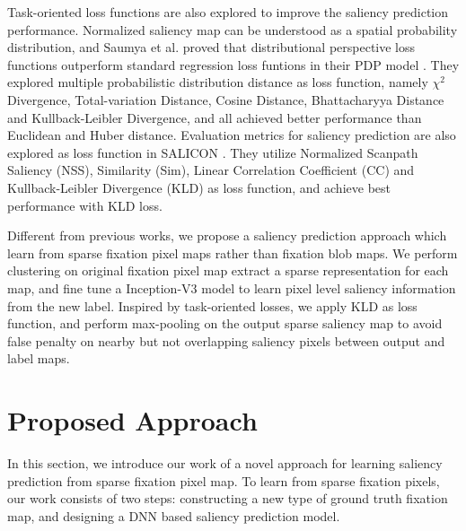 \documentclass[letterpaper, 10 pt, conference]{ieeeconf}  %
\begin{document}
\par Task-oriented loss functions are also explored to improve the saliency prediction performance. Normalized saliency map can be understood as a spatial probability distribution, and Saumya et al. proved that distributional perspective loss functions outperform standard regression loss funtions in their PDP model \cite{b21}. They explored multiple probabilistic distribution distance as loss function, namely $\chi^{2}$ Divergence, Total-variation Distance, Cosine Distance, Bhattacharyya Distance and Kullback-Leibler Divergence, and all achieved better performance than Euclidean and Huber distance. Evaluation metrics for saliency prediction are also explored as loss function in SALICON \cite{b7}. They utilize Normalized Scanpath Saliency (NSS), Similarity (Sim), Linear Correlation Coefficient (CC) and Kullback-Leibler Divergence (KLD) as loss function, and achieve best performance with KLD loss.

\par Different from previous works, we propose a saliency prediction approach which learn from sparse fixation pixel maps rather than fixation blob maps. We perform clustering on original fixation pixel map extract a sparse representation for each map, and fine tune a Inception-V3 model \cite{b22} to learn pixel level saliency information from the new label. Inspired by task-oriented losses, we apply KLD as loss function, and perform max-pooling on the output sparse saliency map to avoid false penalty on nearby but not overlapping saliency pixels between output and label maps.

\section{Proposed Approach}

\par In this section, we introduce our work of a novel approach for learning saliency prediction from sparse fixation pixel map. To learn from sparse fixation pixels, our work consists of two steps: constructing a new type of ground truth fixation map, and designing a DNN based saliency prediction model.
\end{document}
